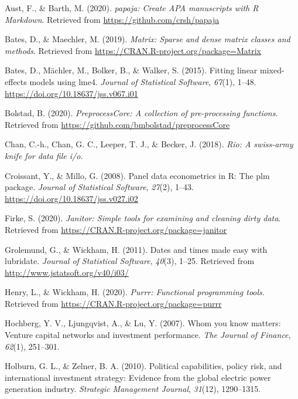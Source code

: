 \documentclass[
  english,
  man]{apa6}
\begin{document}
\begingroup
\setlength{\parindent}{-0.5in}
\setlength{\leftskip}{0.5in}

\hypertarget{refs}{}
\leavevmode\hypertarget{ref-R-papaja}{}%
Aust, F., \& Barth, M. (2020). \emph{papaja: Create APA manuscripts with R Markdown}. Retrieved from \url{https://github.com/crsh/papaja}

\leavevmode\hypertarget{ref-R-Matrix}{}%
Bates, D., \& Maechler, M. (2019). \emph{Matrix: Sparse and dense matrix classes and methods}. Retrieved from \url{https://CRAN.R-project.org/package=Matrix}

\leavevmode\hypertarget{ref-R-lme4}{}%
Bates, D., Mächler, M., Bolker, B., \& Walker, S. (2015). Fitting linear mixed-effects models using lme4. \emph{Journal of Statistical Software}, \emph{67}(1), 1--48. \url{https://doi.org/10.18637/jss.v067.i01}

\leavevmode\hypertarget{ref-R-preprocessCore}{}%
Bolstad, B. (2020). \emph{PreprocessCore: A collection of pre-processing functions}. Retrieved from \url{https://github.com/bmbolstad/preprocessCore}

\leavevmode\hypertarget{ref-R-rio}{}%
Chan, C.-h., Chan, G. C., Leeper, T. J., \& Becker, J. (2018). \emph{Rio: A swiss-army knife for data file i/o}.

\leavevmode\hypertarget{ref-R-plm_a}{}%
Croissant, Y., \& Millo, G. (2008). Panel data econometrics in R: The plm package. \emph{Journal of Statistical Software}, \emph{27}(2), 1--43. \url{https://doi.org/10.18637/jss.v027.i02}

\leavevmode\hypertarget{ref-R-janitor}{}%
Firke, S. (2020). \emph{Janitor: Simple tools for examining and cleaning dirty data}. Retrieved from \url{https://CRAN.R-project.org/package=janitor}

\leavevmode\hypertarget{ref-R-lubridate}{}%
Grolemund, G., \& Wickham, H. (2011). Dates and times made easy with lubridate. \emph{Journal of Statistical Software}, \emph{40}(3), 1--25. Retrieved from \url{http://www.jstatsoft.org/v40/i03/}

\leavevmode\hypertarget{ref-R-purrr}{}%
Henry, L., \& Wickham, H. (2020). \emph{Purrr: Functional programming tools}. Retrieved from \url{https://CRAN.R-project.org/package=purrr}

\leavevmode\hypertarget{ref-hochberg2007whom}{}%
Hochberg, Y. V., Ljungqvist, A., \& Lu, Y. (2007). Whom you know matters: Venture capital networks and investment performance. \emph{The Journal of Finance}, \emph{62}(1), 251--301.

\leavevmode\hypertarget{ref-holburn2010political}{}%
Holburn, G. L., \& Zelner, B. A. (2010). Political capabilities, policy risk, and international investment strategy: Evidence from the global electric power generation industry. \emph{Strategic Management Journal}, \emph{31}(12), 1290--1315.
\end{document}
